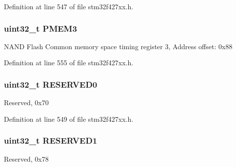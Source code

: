 Definition at line 547 of file stm32f427xx.\+h.

\subsubsection[{\texorpdfstring{P\+M\+E\+M3}{PMEM3}}]{ uint32\+\_\+t P\+M\+E\+M3}\hypertarget{struct_f_m_c___bank2__3___type_def_aba8981e4f06cfb3db7d9959242052f80}{}\label{struct_f_m_c___bank2__3___type_def_aba8981e4f06cfb3db7d9959242052f80}
N\+A\+ND Flash Common memory space timing register 3, Address offset\+: 0x88 

Definition at line 555 of file stm32f427xx.\+h.

\subsubsection[{\texorpdfstring{R\+E\+S\+E\+R\+V\+E\+D0}{RESERVED0}}]{\setlength{\rightskip}{0pt plus 5cm}uint32\+\_\+t R\+E\+S\+E\+R\+V\+E\+D0}\hypertarget{struct_f_m_c___bank2__3___type_def_af86c61a5d38a4fc9cef942a12744486b}{}\label{struct_f_m_c___bank2__3___type_def_af86c61a5d38a4fc9cef942a12744486b}
Reserved, 0x70 

Definition at line 549 of file stm32f427xx.\+h.

\subsubsection[{\texorpdfstring{R\+E\+S\+E\+R\+V\+E\+D1}{RESERVED1}}]{\setlength{\rightskip}{0pt plus 5cm}uint32\+\_\+t R\+E\+S\+E\+R\+V\+E\+D1}\hypertarget{struct_f_m_c___bank2__3___type_def_ac4ac04e673b5b8320d53f7b0947db902}{}\label{struct_f_m_c___bank2__3___type_def_ac4ac04e673b5b8320d53f7b0947db902}
Reserved, 0x78 

